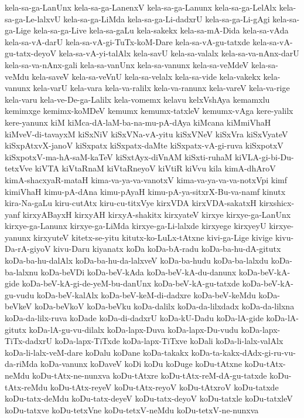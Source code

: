{kela-sa-ga-LanUnx
kela-sa-ga-LanenxV
kela-sa-ga-Lanunx
kela-sa-ga-LelAlx
kela-sa-ga-Le-lalxvU
kela-sa-ga-LiMda
kela-sa-ga-Li-dadxrU
kela-sa-ga-Li-gAgi
kela-sa-ga-Lige
kela-sa-ga-Live
kela-sa-gaLu
kela-sakekx
kela-sa-mA-Dida
kela-sa-vAda
kela-sa-vA-darU
kela-sa-vA-gi-TuTx-koM-Dare
kela-sa-vA-gu-tatxde
kela-sa-vA-gu-tatx-deyoV
kela-sa-vA-yi-talAlx
kela-savU
kela-sa-valalx
kela-sa-va-nAnx-darU
kela-sa-va-nAnx-gali
kela-sa-vanUnx
kela-sa-vanunx
kela-sa-veMdeV
kela-sa-veMdu
kela-saveV
kela-sa-veVnU
kela-sa-velalx
kela-sa-vide
kela-vakekx
kela-vanunx
kela-varU
kela-vara
kela-va-ralilx
kela-va-ranunx
kela-vareV
kela-va-rige
kela-varu
kela-ve-De-ga-Lalilx
kela-vomemx
kelavu
kelxVshAya
kemamxlu
kemimxge
kemimx-koMDeV
kemumx
kemumx-tatxleV
kemumx-vAga
kere-yalilx
kere-yanunx
kiM
kiMca-dA-laM-ba-na-mu-pA-dAya
kiMcana
kiMmiVhaH
kiMveV-di-tavayxM
kiSxNiV
kiSxVNa-vA-yitu
kiSxVNeV
kiSxVra
kiSxVyateV
kiSxpAtxvX-janoV
kiSxpatx
kiSxpatx-daMte
kiSxpatx-vA-gi-ruva
kiSxpotxV
kiSxpotxV-ma-hA-saM-kaTeV
kiSxtAyx-diVnAM
kiSxti-ruhaM
kiVLA-gi-bi-Du-tetxVve
kiVTA
kiVtaRnaM
kiVtaRneyoV
kiVtiR
kiVvu
kila
kimA-dhAroV
kimA-shacxyaR-mataH
kima-va-ya-va-vanotxV
kima-va-ya-va-va-notxVpi
kimf
kimiVhaH
kimu-pA-dAna
kimu-pAyaH
kimu-pA-ya-sitxrX-Bu-va-namf
kinutx
kira-Na-gaLu
kiru-cutAtx
kiru-cu-titxVye
kirxVDA
kirxVDA-sakatxH
kirxshicx-yanf
kirxyABayxH
kirxyAH
kirxyA-shakitx
kirxyateV
kirxye
kirxye-ga-LanUnx
kirxye-ga-Lanunx
kirxye-ga-LiMda
kirxye-ga-Li-lalxde
kirxyege
kirxyeyU
kirxye-yanunx
kirxyuteV
kitetx-se-yitu
kitutx-ko-LuLx-tAtxne
kivi-ga-Lige
kivige
kivu-Da-rA-giyoV
kivu-Daru
kiyanatx
koDa
koDa-bA-radu
koDa-ba-hu-dA-gitutx
koDa-ba-hu-dalAlx
koDa-ba-hu-da-lalxveV
koDa-ba-hudu
koDa-ba-lalxdu
koDa-ba-lalxnu
koDa-beVDi
koDa-beV-kAda
koDa-beV-kA-du-danunx
koDa-beV-kA-gide
koDa-beV-kA-gi-de-yeM-bu-danUnx
koDa-beV-kA-gu-tatxde
koDa-beV-kA-gu-vudu
koDa-beV-kalAlx
koDa-beV-keM-di-dadxre
koDa-beV-keMdu
koDa-beVkeV
koDa-beVkoV
koDa-beVku
koDa-dalilx
koDa-da-lilxdadx
koDa-da-lilxna
koDa-da-lilx-ruva
koDade
koDa-di-dadxrU
koDa-kU-Dadu
koDa-lA-gide
koDa-lA-gitutx
koDa-lA-gu-vu-dilalx
koDa-lapx-Duva
koDa-lapx-Du-vudu
koDa-lapx-TiTx-dadxrU
koDa-lapx-TiTxde
koDa-lapx-TiTxve
koDali
koDa-li-lalx-valAlx
koDa-li-lalx-veM-dare
koDalu
koDane
koDa-takakx
koDa-ta-kakx-dAdx-gi-ru-vu-da-riMda
koDa-vanunx
koDaveV
koDi
koDu
koDuge
koDu-tAtxne
koDu-tAtx-neMdu
koDu-tAtx-ne-nunxva
koDu-tAtxre
koDu-tAtx-reM-dA-gu-tatxde
koDu-tAtx-reMdu
koDu-tAtx-reyeV
koDu-tAtx-reyoV
koDu-tAtxroV
koDu-tatxde
koDu-tatx-deMdu
koDu-tatx-deyeV
koDu-tatx-deyoV
koDu-tatxle
koDu-tatxleV
koDu-tatxve
koDu-tetxVne
koDu-tetxV-neMdu
koDu-tetxV-ne-nunxva
}
